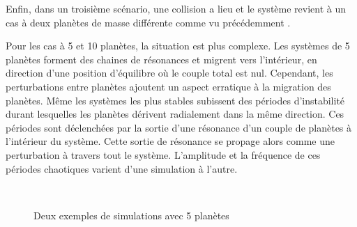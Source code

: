 Enfin, dans un troisième scénario, une collision a lieu et le système revient à un cas à deux planètes de masse différente comme vu précédemment . 

\bigskip

Pour les cas à 5 et 10 planètes, la situation est plus complexe. Les systèmes de 5 planètes forment des chaines de résonances et migrent vers l'intérieur, en direction d'une position d'équilibre où le couple total est nul. Cependant, les perturbations entre planètes ajoutent un aspect erratique à la migration des planètes. Même les systèmes les plus stables subissent des périodes d'instabilité durant lesquelles les planètes dérivent radialement dans la même direction. Ces périodes sont déclenchées par la sortie d'une résonance d'un couple de planètes à l'intérieur du système. Cette sortie de résonance se propage alors comme une perturbation à travers tout le système. L'amplitude et la fréquence de ces périodes chaotiques varient d'une simulation à l'autre. 

\begin{figure}[htbp]
\centering
{}\\
\caption{Deux exemples de simulations avec 5 planètes}\label{fig:timed-resonance-stability}
\end{figure}

